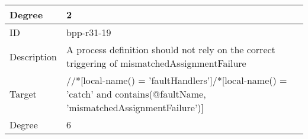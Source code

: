 \begin{center}
\begin{tiny}
\begin{longtable}{p{}|p{}}
\myrowcolour
Degree & 2\\
\midrule
ID & bpp-r31-19\\
\myrowcolour
Description &A process definition should not rely on the correct triggering of mismatchedAssignmentFailure\\
Target & //*[local-name() = 'faultHandlers']/*[local-name() = 'catch' and contains(@faultName, 'mismatchedAssignmentFailure')]\\
\myrowcolour
Degree & 6\\
\end{longtable}
\end{tiny}
\end{center}
